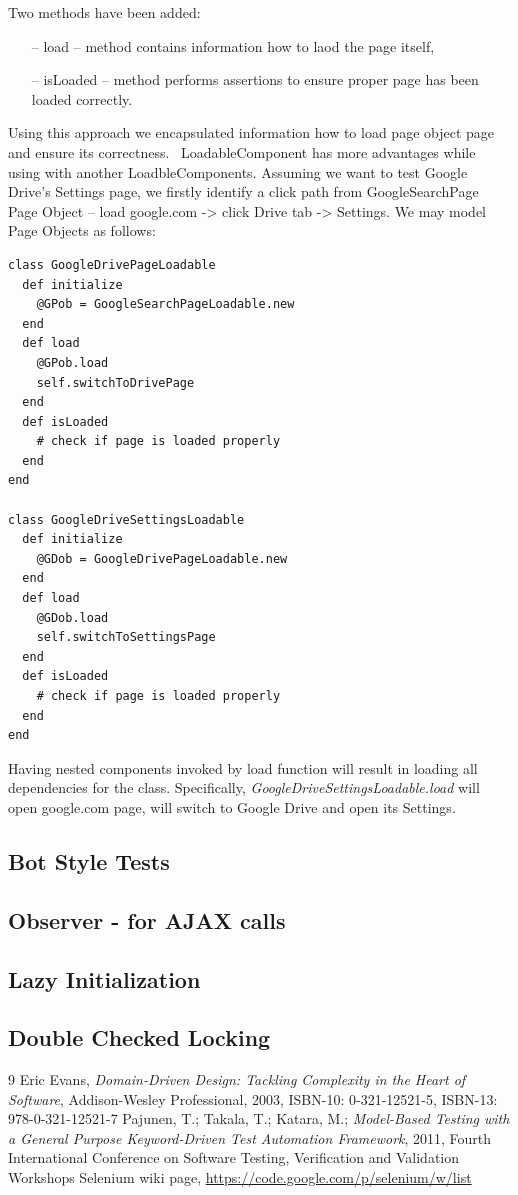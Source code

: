 \documentclass[12pt,twoside]{article}
\begin{document}
Two methods have been added:
\begin{itemize}
\item [--] load -- method contains information how to laod the page itself,
\item [--] isLoaded -- method performs assertions to ensure proper page has been loaded correctly.
\end{itemize}
Using this approach we encapsulated information how to load page object page and ensure its correctness. \
LoadableComponent has more advantages while using with another LoadbleComponents. Assuming we want to test Google Drive's Settings page, we firstly identify a click path from GoogleSearchPage Page Object -- load google.com -> click Drive tab -> Settings.
We may model Page Objects as follows:
\begin{verbatim}
class GoogleDrivePageLoadable 
  def initialize
    @GPob = GoogleSearchPageLoadable.new
  end
  def load
    @GPob.load
    self.switchToDrivePage
  end 
  def isLoaded
    # check if page is loaded properly
  end
end

class GoogleDriveSettingsLoadable
  def initialize 
    @GDob = GoogleDrivePageLoadable.new
  end
  def load 
    @GDob.load
    self.switchToSettingsPage
  end 
  def isLoaded
    # check if page is loaded properly  
  end
end
\end{verbatim}

Having nested components invoked by load function will result in loading all dependencies for the class. Specifically, \emph{GoogleDriveSettingsLoadable.load} will open google.com page, will switch to Google Drive and open its Settings.


\subsection{Bot Style Tests}

\subsection{Observer - for AJAX calls}
\subsection{Lazy Initialization}
\subsection{Double Checked Locking}




\begin{thebibliography} {9}
 Eric Evans, {\sl Domain-Driven Design: Tackling Complexity in the Heart of Software}, Addison-Wesley Professional, 2003, ISBN-10: 0-321-12521-5, ISBN-13: 978-0-321-12521-7
\bibitem{ref:2.1} Pajunen, T.; Takala, T.; Katara, M.; {\sl Model-Based Testing with a General Purpose Keyword-Driven Test Automation Framework}, 2011, Fourth International Conference on Software Testing, Verification and Validation Workshops
\bibitem{ref:3.1} Selenium wiki page, \url{https://code.google.com/p/selenium/w/list}
\end{thebibliography}
\end{document}
